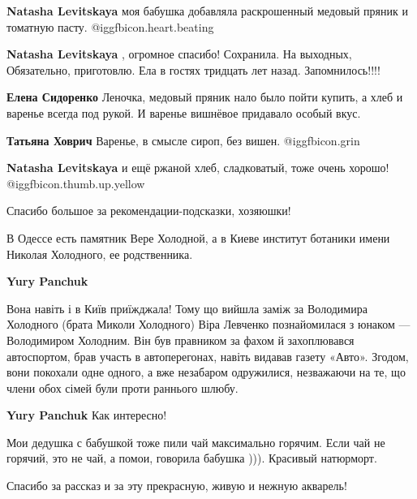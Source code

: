 \begin{itemize}
\begin{itemize}
\begin{itemize} %
\textbf{Natasha Levitskaya} моя бабушка добавляла раскрошенный медовый пряник и томатную пасту. @igg{fbicon.heart.beating} 

\textbf{Natasha Levitskaya} , огромное спасибо! Сохранила. На выходных,
Обязательно, приготовлю. Ела в гостях тридцать лет назад. Запомнилось!!!!

\textbf{Елена Сидоренко}
Леночка, медовый пряник нало было пойти купить, а хлеб и варенье всегда под рукой. И варенье вишнёвое придавало особый вкус.

\textbf{Татьяна Ховрич}
Варенье, в смысле сироп, без вишен. @igg{fbicon.grin} 

\textbf{Natasha Levitskaya} и ещё ржаной хлеб, сладковатый, тоже очень хорошо! @igg{fbicon.thumb.up.yellow} 

Спасибо большое за рекомендации-подсказки, хозяюшки!
\end{itemize} %

\end{itemize} %


В Одессе есть памятник Вере Холодной, а в Киеве институт ботаники имени Николая
Холодного, ее родственника.

\begin{itemize} %
\textbf{Yury Panchuk} 

Вона навіть і в Київ приїжджала! Тому що вийшла заміж за Володимира Холодного
(брата Миколи Холодного) Віра Левченко познайомилася з юнаком — Володимиром
Холодним. Він був правником за фахом й захоплювався автоспортом, брав участь в
автоперегонах, навіть видавав газету «Авто». Згодом, вони покохали одне одного,
а вже незабаром одружилися, незважаючи на те, що члени обох сімей були проти
раннього шлюбу.

\textbf{Yury Panchuk} Как интересно!
\end{itemize} %


Мои дедушка с бабушкой тоже пили чай максимально горячим. Если чай не горячий,
это не чай, а помои, говорила бабушка ))). Красивый натюрморт.



Спасибо за рассказ и за эту прекрасную, живую и нежную акварель!


\end{itemize}
